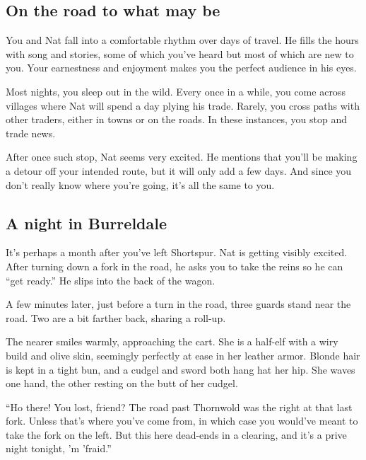 \begin{multicols}{2}
  \subsection{On the road to what may be}
  \begin{aloud}
    You and Nat fall into a comfortable rhythm over days of travel.
    He fills the hours with song and stories, some of which you've heard but most of which are new to you.
    Your earnestness and enjoyment makes you the perfect audience in his eyes.

    Most nights, you sleep out in the wild.
    Every once in a while, you come across villages where Nat will spend a day plying his trade.
    Rarely, you cross paths with other traders, either in towns or on the roads.
	In these instances, you stop and trade news.
	
	After once such stop, Nat seems very excited.
	He mentions that you'll be making a detour off your intended route, but it will only add a few days.
	And since you don't really know where you're going, it's all the same to you.
  \end{aloud}

  \vfill\null
  \columnbreak

\subsection{A night in Burreldale}
  \begin{aloud}
    It's perhaps a month after you've left Shortspur.
    Nat is getting visibly excited.
    After turning down a fork in the road, he asks you to take the reins so he can ``get ready.''
    He slips into the back of the wagon.
    
    A few minutes later, just before a turn in the road, three guards stand near the road.
    Two are a bit farther back, sharing a roll-up.

    The nearer smiles warmly, approaching the cart.
    She is a half-elf with a wiry build and olive skin, seemingly perfectly at ease in her leather armor.
    Blonde hair is kept in a tight bun, and a cudgel and sword both hang hat her hip.
    She waves one hand, the other resting on the butt of her cudgel.
  \end{aloud}

  ``Ho there!
    You lost, friend?
    The road past Thornwold was the right at that last fork.
    Unless that's where you've come from, in which case you would've meant to take the fork on the left.
    But this here dead-ends in a clearing, and it's a prive night tonight, 'm 'fraid.''


\end{multicols}
